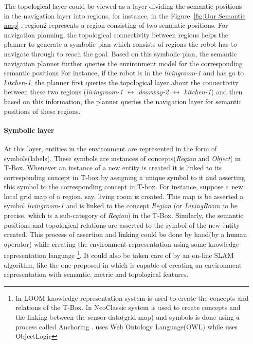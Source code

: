 The topological layer  could be viewed as a layer dividing the semantic positions in the navigation layer into regions,
for instance, in the Figure~\ref{fig:Our Semantic map} , region2 represents a region consisting of two semantic positions.
For navigation planning, the topological connectivity between regions helps the planner to generate a symbolic plan which consists of regions the robot
has to navigate through to reach the goal. Based on this symbolic plan, the semantic navigation planner further queries the environment model for the corresponding semantic positions
For instance, if the robot is in the \textit{livingroom-1} and has go to \textit{kitchen-1}, the planner first queries the topological layer about the connectivity between these two regions ({\textit{livingroom-1 $\longleftrightarrow$ doorway-2 $\longleftrightarrow$ kitchen-1}})
and then based on this information, the planner queries the navigation layer for semantic positions of these regions.

\paragraph{{Symbolic layer}}
At this layer, entities in the environment are represented in the form of symbols(labels).
These symbols are instances of concepts(\textit{Region} and \textit{Object}) in T-Box.
Whenever an instance of a new entity is created it is linked to its corresponding concept in T-box by assigning a unique symbol to it and asserting this symbol to the corresponding concept in T-box.
For instance, suppose a new local grid map of a region, say, living room is created. This map is be asserted a symbol \textit{livingroom-1} and
is linked to the concept \textit{Region} (or \textit{LivingRoom} to be precise, which is a sub-category of \textit{Region}) in the T-Box. 
Similarly, the semantic positions and topological relations are asserted to the symbol of the new entity created. 
This process of assertion and linking could be done by hand(by a human operator) while creating the environment representation using some knowledge representation language \footnote[5]{In \cite{2} LOOM knowledge representation system\cite{24} is used to create the concepts and relations of the T-Box.
In \cite{3, 4} NeoClassic system\cite{25} is used to create concepts and the linking between the sensor data(grid map) and symbols is done using a process called Anchoring \cite{23}. \cite{22, 17} uses Web Ontology Language(OWL)\cite{26} while \cite{1} uses ObjectLogic\cite{27}}.
It could also be taken care of by an on-line SLAM algorithm, like the one proposed in \cite{8} which is capable of creating an environment representation with semantic, metric and topological features.\\

